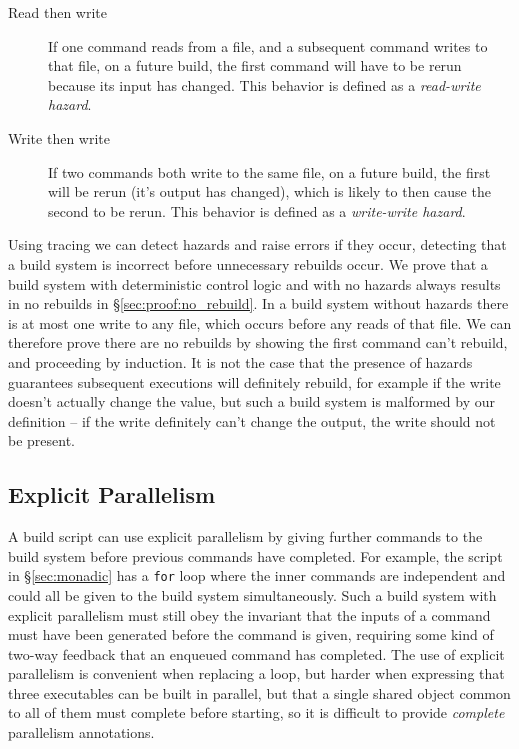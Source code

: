 \begin{description}
\item[Read then write] If one command reads from a file, and a subsequent command writes to that file, on a future build, the first command will have to be rerun because its input has changed. This behavior is defined as a \emph{read-write hazard}.
\item[Write then write] If two commands both write to the same file, on a future build, the first will be rerun (it's output has changed), which is likely to then cause the second to be rerun. This behavior is defined as a \emph{write-write hazard}.
\end{description}

Using tracing we can detect hazards and raise errors if they occur, detecting that a build system is incorrect before unnecessary rebuilds occur. We prove that a build system with deterministic control logic and with no hazards always results in no rebuilds in \S\ref{sec:proof:no_rebuild}. In a build system without hazards there is at most one write to any file, which occurs before any reads of that file. We can therefore prove there are no rebuilds by showing the first command can't rebuild, and proceeding by induction. It is not the case that the presence of hazards guarantees subsequent executions will definitely rebuild, for example if the write doesn't actually change the value, but such a build system is malformed by our definition -- if the write definitely can't change the output, the write should not be present.

\subsection{Explicit Parallelism}
\label{sec:explicit_parallelism}

A build script can use explicit parallelism by giving further commands to the build system before previous commands have completed. For example, the script in \S\ref{sec:monadic} has a \texttt{for} loop where the inner commands are independent and could all be given to the build system simultaneously. Such a build system with explicit parallelism must still obey the invariant that the inputs of a command must have been generated before the command is given, requiring some kind of two-way feedback that an enqueued command has completed. The use of explicit parallelism is convenient when replacing a loop, but harder when expressing that three executables can be built in parallel, but that a single shared object common to all of them must complete before starting, so it is difficult to provide \emph{complete} parallelism annotations.

